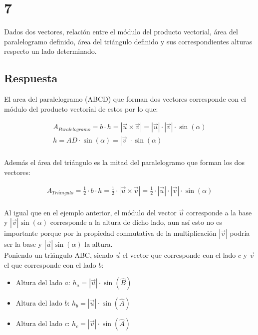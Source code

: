 \documentclass[
	12pt, %
	spanish, %
]{fphw}
\newcommand{\vu}{\vec{u}}
\newcommand{\vv}{\vec{v}}
\begin{document}
\section*{7}
\begin{problem}
	Dados dos vectores, relación entre el módulo del producto vectorial, área del
paralelogramo definido, área del triángulo definido y sus correspondientes
alturas respecto un lado determinado.
\end{problem}

\subsection*{Respuesta}

El area del paralelogramo (ABCD) que forman dos vectores corresponde con el módulo del producto vectorial de estos por lo que:

\begin{gather*}
	A_{Paralelogramo} = b \cdot h = |\vu \times \vv| = |\vu| \cdot |\vv| \cdot \sin(\alpha) \\
	h = AD \cdot \sin(\alpha) = |\vv| \cdot \sin(\alpha)\\
\end{gather*}

Además el área del triángulo es la mitad del paralelogramo que forman los dos vectores:

\begin{gather*}
A_{Tri\acute{a}ngulo} = \frac {1} {2} \cdot b \cdot h = \frac{1}{2} \cdot |\vu \times \vv| = \frac{1}{2} \cdot |\vu| \cdot |\vv| \cdot \sin(\alpha)\\
\end{gather*}

Al igual que en el ejemplo anterior, el módulo del vector $\vu$ corresponde a la base y $|\vv|\sin(\alpha)$ corresponde a la altura de dicho lado, aun así esto no es importante porque por la propiedad conmutativa de la multiplicación $|\vv|$ podría ser la base y $|\vu|\sin(\alpha)$ la altura.\\

Poniendo un triángulo ABC, siendo $\vu$ el vector que corresponde con el lado $c$ y $\vv$ el que corresponde con el lado $b$:

\begin{itemize}
	\item Altura del lado $a$: $h_a= |\vu|\cdot\sin(\hat{B})$
	\item Altura del lado $b$: $h_b= |\vu|\cdot\sin(\hat{A})$
	\item Altura del lado $c$: $h_c= |\vv|\cdot\sin(\hat{A})$
\end{itemize}
\end{document}
